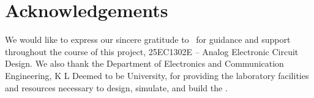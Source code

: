 \chapter*{Acknowledgements}

We would like to express our sincere gratitude to \facultyname\ for guidance and support throughout the course of this project, 25EC1302E -- Analog Electronic Circuit Design. We also thank the Department of Electronics and Communication Engineering, K L Deemed to be University, for providing the laboratory facilities and resources necessary to design, simulate, and build the \projecttitle.

